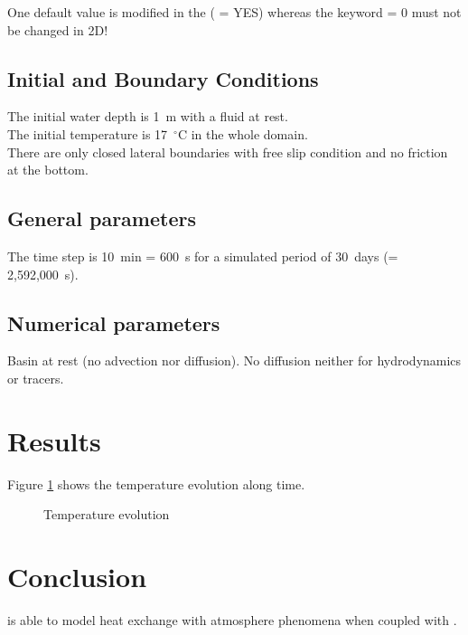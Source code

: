 One default value is modified in the  
( = YES)
whereas the keyword  = 0 must not be
changed in 2D!
%
\subsection{Initial and Boundary Conditions}
%
The initial water depth is 1~m with a fluid at rest.\\
The initial temperature is 17~$^{\circ}$C in the whole domain.\\

There are only closed lateral boundaries with free slip condition and no
friction at the bottom.
%
\subsection{General parameters}
%
The time step is 10~min = 600~s for a simulated period of 30~days
(= 2,592,000~s).
%
\subsection{Numerical parameters}
%
Basin at rest (no advection nor diffusion).
No diffusion neither for hydrodynamics or tracers.
%
%
%
\section{Results}
%
Figure \ref{fig:waq2d_thermic:res} shows the temperature evolution along time.

\begin{figure} [H]
\centering
{}
 \caption{Temperature evolution}
 \label{fig:waq2d_thermic:res}
\end{figure}
%
\section{Conclusion}
%
\waqtel is able to model heat exchange with atmosphere phenomena when coupled
with .
%
